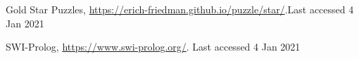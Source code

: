 
%
%
%
% 
% 
%
\begin{thebibliography}{8}
Gold Star Puzzles, \url{https://erich-friedman.github.io/puzzle/star/}.Last accessed 4 Jan 2021 

SWI-Prolog, \url{https://www.swi-prolog.org/}. Last accessed 4 Jan 2021


\end{thebibliography}